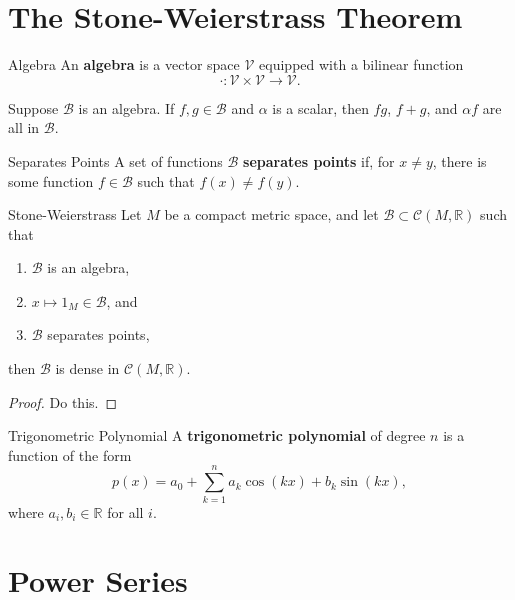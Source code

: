 \documentclass[10pt]{report}
\begin{document}

\section{The Stone-Weierstrass Theorem}

\begin{defn}{Algebra}{}
An \textbf{algebra} is a vector space $\mathcal{V}$ equipped with a bilinear function \[\cdot : \mathcal{V} \times \mathcal{V} \to \mathcal{V}.\]
\end{defn}

Suppose $\mathcal{B}$ is an algebra. If $f,g \in \mathcal{B}$ and $\alpha$ is a scalar, then $fg$, $f+g$, and $\alpha f$ are all in $\mathcal{B}$.

\begin{defn}{Separates Points}{}
	A set of functions $\mathcal{B}$ \textbf{separates points} if, for $x \neq y$, there is some function $f \in \mathcal{B}$ such that $f(x) \neq f(y)$.
\end{defn}

\begin{thrm}{Stone-Weierstrass}{}
	Let $M$ be a compact metric space, and let $\mathcal{B} \subset \mathcal{C}(M, \mathbb{R})$ such that
	\begin{enumerate}
		\item $\mathcal{B}$ is an algebra,
		\item $x \mapsto 1_M \in \mathcal{B}$, and
		\item $\mathcal{B}$ separates points,
	\end{enumerate}
	then $\mathcal{B}$ is dense in $\mathcal{C}(M, \mathbb{R})$.
\end{thrm}
\begin{proof}
	{\color{red}Do this.}
\end{proof}

\begin{defn}{Trigonometric Polynomial}{}
A \textbf{trigonometric polynomial} of degree $n$ is a function of the form
\[
	p(x) = a_0 + \sum_{k=1}^{n} a_k \cos(kx) + b_k \sin(kx),
\] where $a_i, b_i \in \mathbb{R}$ for all $i$.
\end{defn}




\section{Power Series}
\end{document}
